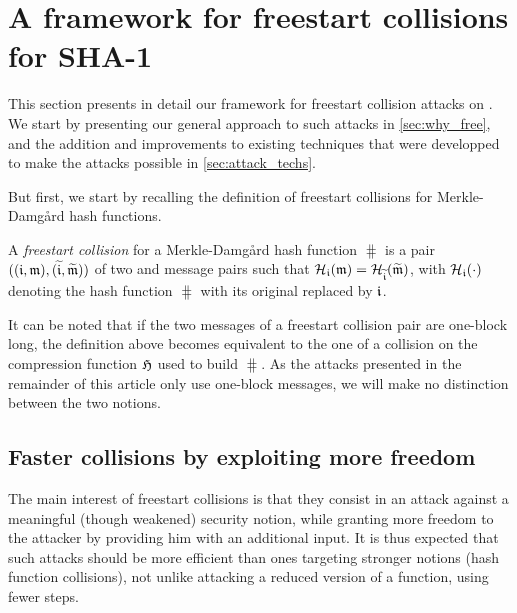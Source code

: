 \section{A framework for freestart collisions for SHA-1}
\label{sec:framework}

This section presents in detail our framework for freestart collision attacks on \shaone. We start by presenting our general approach to such attacks
in \autoref{sec:why_free}, and the addition and improvements to existing techniques that were developped to make the attacks possible in \autoref{sec:attack_techs}.

But first, we start by recalling the definition of freestart collisions for Merkle-Damg\aa rd hash functions.

\begin{defi}
A \emph{freestart collision} for a Merkle-Damg\aa rd hash function $\hash$ is a pair $((\mathfrak{i},\mathfrak{m}), (\widetilde{\mathfrak{i}},\widetilde{\mathfrak{m}}))$
of two \iv and message pairs such that $\operatorname{\mathcal{H}}_{\mathfrak{i}}(\mathfrak{m}) = \operatorname{\mathcal{H}}_{\widetilde{\mathfrak{i}}}(\widetilde{\mathfrak{m}})$, with $\operatorname{\mathcal{H}}_{\mathfrak{i}}(\cdot)$ denoting
the hash function $\hash$ with its original \iv replaced by $\mathfrak{i}$.
\end{defi}

It can be noted that if the two messages of a freestart collision pair are one-block long, the definition above becomes equivalent to the one of a collision
on the compression function $\operatorname{\mathfrak{H}}$ used to build $\hash$. As the attacks presented in the remainder of this article only use one-block messages, we
will make no distinction between the two notions. 


\subsection{Faster collisions by exploiting more freedom}
\label{sec:why_free}

The main interest of freestart collisions is that they consist in an attack against a meaningful (though weakened) security notion, while granting more freedom to
the attacker by providing him with an additional input. It is thus expected that such attacks should be more efficient than ones targeting stronger notions (\eg hash function
collisions), not unlike attacking a reduced version of a function, using fewer steps.

